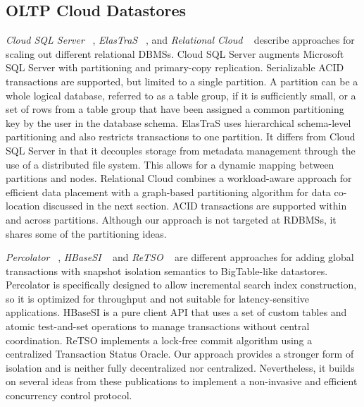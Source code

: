 \documentclass[10pt,final,journal]{IEEEtran}
\begin{document}
\subsection{OLTP Cloud Datastores}
\emph{Cloud SQL Server} ~\cite{Campbell:2010:ESF:1807167.1807280, Bernstein:2011:AMS:2004686.2005651}, \emph{ElasTraS} ~\cite{Das:2009:EET:1855533.1855540, Das:2010:EAE}, and \emph{Relational Cloud} ~\cite{Curino:2011:JPMWMBZ11} describe approaches for scaling out different relational DBMSs. Cloud SQL Server augments Microsoft SQL Server with partitioning and primary-copy replication. Serializable ACID transactions are supported, but limited to a single partition. A partition can be a whole logical database, referred to as a table group, if it is sufficiently small, or a set of rows from a table group that have been assigned a common partitioning key by the user in the database schema. ElasTraS uses hierarchical schema-level partitioning and also restricts transactions to one partition. It differs from Cloud SQL Server in that it decouples storage from metadata management through the use of a distributed file system. This allows for a dynamic mapping between partitions and nodes. Relational Cloud combines a workload-aware approach for efficient data placement with a graph-based partitioning algorithm for data co-location discussed in the next section. ACID transactions are supported within and across partitions. Although our approach is not targeted at RDBMSs, it shares some of the partitioning ideas.

\emph{Percolator} ~\cite{Peng:2010:LIP:1924943.1924961}, \emph{HBaseSI} ~\cite{Zhang:2010:5697970} and \emph{ReTSO} ~\cite{Junqueira:2011:LTS:2056318.2057148} are different approaches for adding global transactions with snapshot isolation semantics to BigTable-like datastores. Percolator is specifically designed to allow incremental search index construction, so it is optimized for throughput and not suitable for latency-sensitive applications. HBaseSI is a pure client API that uses a set of custom tables and atomic test-and-set operations to manage transactions without central coordination. ReTSO implements a lock-free commit algorithm using a centralized Transaction Status Oracle. Our approach provides a stronger form of isolation and is neither fully decentralized nor centralized. Nevertheless, it builds on several ideas from these publications to implement a non-invasive and efficient concurrency control protocol.
\end{document}
